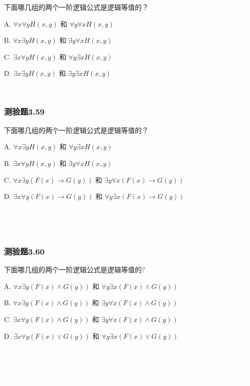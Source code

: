 \documentclass[UTF8, heading=true]{ctexart}
\begin{document}
下面哪几组的两个一阶逻辑公式是逻辑等值的？

A. $\forall x \forall y H(x, y)$ 和 $\forall y \forall x H(x, y)$

B.  $\forall x \exists y H(x, y)$ 和 $\exists y \forall x H(x, y)$

C.  $\exists x \forall y H(x, y)$ 和 $\forall y \exists x H(x, y)$

D.   $\exists x \exists y H(x, y)$ 和 $\exists y \exists x H(x, y)$

\textcolor{white}{答案：AD}

\subsubsection{测验题3.59}

下面哪几组的两个一阶逻辑公式是逻辑等值的？

A. $\forall x \exists y H(x, y)$ 和 $\forall y \exists x H(x, y)$

B.  $\exists x \forall y H(x, y)$ 和 $\exists y \forall x H(x, y)$

C.  $\forall x \exists y(F(x) \rightarrow G(y))$ 和 $\exists y \forall x(F(x) \rightarrow G(y))$

D.   $\exists x \forall y(F(x) \rightarrow G(y))$ 和 $\forall y \exists x(F(x) \rightarrow G(y))$

\textcolor{white}{答案：CD}

\textcolor{white}{解析：直接使用量词辖域的收缩/扩张等值式。}

\subsubsection{测验题3.60}

下面哪几组的两个一阶逻辑公式是逻辑等值的?

A. $\forall x \exists y(F(x) \wedge G(y))$ 和 $\forall y \exists x(F(x) \wedge G(y))$

B. $\forall x \exists y(F(x) \wedge G(y))$ 和 $\exists y \forall x(F(x) \wedge G(y))$

C. $\exists x \forall y(F(x) \wedge G(y))$ 和 $\exists y \forall x(F(x) \wedge G(y))$

D. $ \exists x \forall y(F(x) \vee G(y))$ 和 $\forall y \exists x(F(x) \vee G(y))$

\textcolor{white}{答案：BD}

\textcolor{white}{解析：直接使用量词辖域的收缩等值式。区别于\textit{测验题3.39},该题的$x$和$y$位于同一个函数中。}
\end{document}
